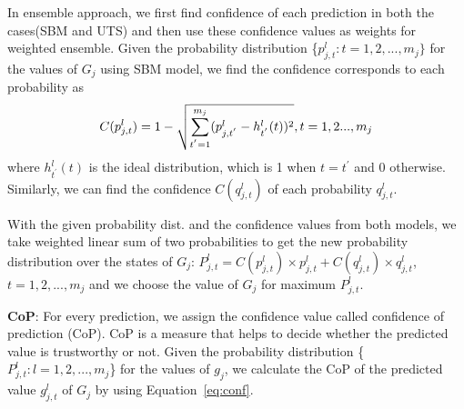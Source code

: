 In ensemble approach, we first find confidence of each prediction in both the cases(SBM and UTS) and then use these confidence values as weights for weighted ensemble. Given the probability distribution \{$p^l_{j,t}: t=1, 2,..., m_j\}$ for the values of $G_j$ using SBM model, we find the confidence corresponds to each probability as
\vspace{-7pt}
\begin{equation}
\scriptsize
 C(p^l_{j,t}) = 1 -  \sqrt{\sum_{t^{'}=1}^{m_j}(p^l_{j,t^{'}} - h^l_{t^{'}}(t))^2}, t=1,2...,m_j
 \vspace{-8pt}
\label{eq:conf}
\end{equation}
where $h^l_{t^{'}}(t)$ is the ideal distribution, which is 1 when $t = t^{'}$ and 0 otherwise.
Similarly, we can find the confidence $C(q^l_{j,t})$ of each probability $q^l_{j,t}$.

With the given probability dist. and the confidence values from both models, we take weighted linear sum of two probabilities to get the new probability distribution over the states of {\scriptsize $G_j$: $P^l_{j,t} = C(p^l_{j,t}) \times p^l_{j,t} + C(q^l_{j,t}) \times q^l_{j,t}$, $t = 1,2,..., m_j$}
and we choose the value of $G_j$ for maximum $P^l_{j,t}$.

\textbf{CoP}: For every prediction, we assign the confidence value called confidence of prediction (CoP). CoP is a measure that helps to decide whether the predicted value is trustworthy or not. Given the probability distribution \{$P^l_{j,t}: l=1,2,...,m_j$\} for the values of $g_j$, we calculate the CoP of the predicted value $g^l_{j,t}$ of $G_j$ by using Equation~\ref{eq:conf}.


